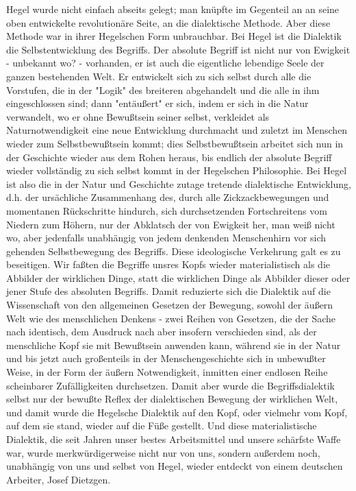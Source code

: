 Hegel wurde nicht einfach abseits gelegt; man knüpfte im
Gegenteil an an seine oben entwickelte revolutionäre Seite, an die
dialektische Methode. Aber diese Methode war in ihrer Hegelschen Form
unbrauchbar. Bei Hegel ist die Dialektik die Selbstentwicklung des
Begriffs. Der absolute Begriff ist nicht nur von Ewigkeit - unbekannt
wo? - vorhanden, er ist auch die eigentliche lebendige Seele der ganzen
bestehenden Welt. Er entwickelt sich zu sich selbst durch alle die
Vorstufen, die in der "Logik" des breiteren abgehandelt und die alle in
ihm eingeschlossen sind; dann "entäußert" er sich, indem er sich in die
Natur verwandelt, wo er ohne Bewußtsein seiner selbst, verkleidet als
Naturnotwendigkeit eine neue Entwicklung durchmacht und zuletzt im
Menschen wieder zum Selbstbewußtsein kommt; dies Selbstbewußtsein
arbeitet sich nun in der Geschichte wieder aus dem Rohen heraus, bis
endlich der absolute Begriff wieder vollständig zu sich selbst kommt in
der Hegelschen Philosophie. Bei Hegel ist also die in der Natur und
Geschichte zutage tretende dialektische Entwicklung, d.h. der
ursächliche Zusammenhang des, durch alle Zickzackbewegungen und
momentanen Rückschritte hindurch, sich durchsetzenden Fortschreitens vom
Niedern zum Höhern, nur der Abklatsch der von Ewigkeit her, man weiß
nicht wo, aber jedenfalls unabhängig von jedem denkenden Menschenhirn
vor sich gehenden Selbstbewegung des Begriffs. Diese ideologische
Verkehrung galt es zu beseitigen. Wir faßten die Begriffe unsres Kopfs
wieder materialistisch als die
Abbilder der wirklichen Dinge, statt die wirklichen Dinge als Abbilder
dieser oder jener Stufe des absoluten Begriffs. Damit reduzierte sich
die Dialektik auf die Wissenschaft von den allgemeinen Gesetzen der
Bewegung, sowohl der äußern Welt wie des menschlichen Denkens - zwei
Reihen von Gesetzen, die der Sache nach identisch, dem Ausdruck nach
aber insofern verschieden sind, als der menschliche Kopf sie mit
Bewußtsein anwenden kann, während sie in der Natur und bis jetzt auch
großenteils in der Menschengeschichte sich in unbewußter Weise, in der
Form der äußern Notwendigkeit, inmitten einer endlosen Reihe scheinbarer
Zufälligkeiten durchsetzen. Damit aber wurde die Begriffsdialektik
selbst nur der bewußte Reflex der dialektischen Bewegung der wirklichen
Welt, und damit wurde die Hegelsche Dialektik auf den Kopf, oder
vielmehr vom Kopf, auf dem sie stand, wieder auf die Füße gestellt. Und
diese materialistische Dialektik, die seit Jahren unser bestes
Arbeitsmittel und unsere schärfste Waffe war, wurde merkwürdigerweise
nicht nur von uns, sondern außerdem noch, unabhängig von uns und selbst
von Hegel, wieder entdeckt von einem deutschen Arbeiter, Josef
Dietzgen.

